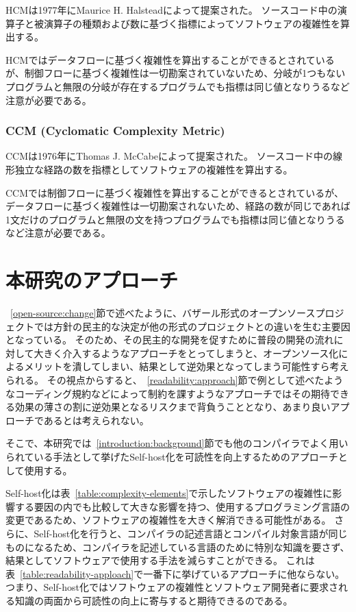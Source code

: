 HCMは1977年にMaurice H. Halsteadによって提案された。
ソースコード中の演算子と被演算子の種類および数に基づく指標によってソフトウェアの複雑性を算出する。

HCMではデータフローに基づく複雑性を算出することができるとされているが、制御フローに基づく複雑性は一切勘案されていないため、分岐が1つもないプログラムと無限の分岐が存在するプログラムでも指標は同じ値となりうるなど注意が必要である。

\subsubsection{CCM (Cyclomatic Complexity Metric)}

CCMは1976年にThomas J. McCabeによって提案された。
ソースコード中の線形独立な経路の数を指標としてソフトウェアの複雑性を算出する。

CCMでは制御フローに基づく複雑性を算出することができるとされているが、データフローに基づく複雑性は一切勘案されないため、経路の数が同じであれば1文だけのプログラムと無限の文を持つプログラムでも指標は同じ値となりうるなど注意が必要である。

\section{本研究のアプローチ}
\label{readability:idea}

~\ref{open-source:change}節で述べたように、バザール形式のオープンソースプロジェクトでは方針の民主的な決定が他の形式のプロジェクトとの違いを生む主要因となっている。
そのため、その民主的な開発を促すために普段の開発の流れに対して大きく介入するようなアプローチをとってしまうと、オープンソース化によるメリットを潰してしまい、結果として逆効果となってしまう可能性すら考えられる。
その視点からすると、~\ref{readability:approach}節で例として述べたようなコーディング規約などによって制約を課すようなアプローチではその期待できる効果の薄さの割に逆効果となるリスクまで背負うこととなり、あまり良いアプローチであるとは考えられない。

そこで、本研究では~\ref{introduction:background}節でも他のコンパイラでよく用いられている手法として挙げたSelf-host化を可読性を向上するためのアプローチとして使用する。

Self-host化は表~\ref{table:complexity-elements}で示したソフトウェアの複雑性に影響する要因の内でも比較して大きな影響を持つ、使用するプログラミング言語の変更であるため、ソフトウェアの複雑性を大きく解消できる可能性がある。
さらに、Self-host化を行うと、コンパイラの記述言語とコンパイル対象言語が同じものになるため、コンパイラを記述している言語のために特別な知識を要さず、結果としてソフトウェアで使用する手法を減らすことができる。
これは表~\ref{table:readability-apploach}で一番下に挙げているアプローチに他ならない。
つまり、Self-host化ではソフトウェアの複雑性とソフトウェア開発者に要求される知識の両面から可読性の向上に寄与すると期待できるのである。

